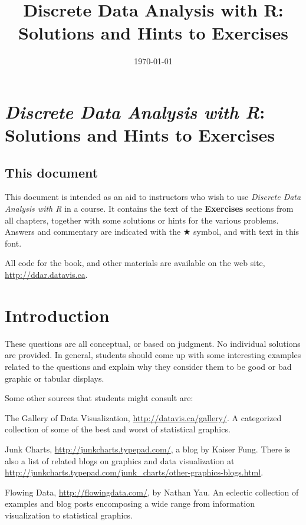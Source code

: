 \documentclass[10pt]{report}\usepackage[]{graphicx}\usepackage[]{color}
\title{\sffamily Discrete Data Analysis with R: \\ Solutions and Hints to Exercises}
\date{\today}
\begin{document}
\maketitle



\chapter*{\emph{Discrete Data Analysis with R}: \\ Solutions and Hints to Exercises}

{
\renewcommand{\baselinestretch}{.5}\normalsize
\sffamily\small
\tableofcontents
}

\vspace{3em}

\section*{This document}
This document is intended as an aid to instructors who wish to use
\emph{Discrete Data Analysis with R} in a course.  It contains the text
of the \textbf{Exercises} sections from all chapters, together with 
some solutions or hints for the various problems.  Answers and commentary are indicated
with the $\bigstar$ symbol, and \textsf{with text in this font}.

All \R code for the book, and other materials are available on the web site,
\url{http://ddar.datavis.ca}.

\clearpage
\chapter{Introduction}\label{ch:intro}
\begin{ans}
These questions are all conceptual, or based on judgment.  No individual solutions are provided.
In general, students should come up with some interesting examples related to the questions
and explain why they consider them to be good or bad graphic or tabular displays.

Some other sources that students might consult are:
\begin{itemize*}
  \item The Gallery of Data Visualization, \url{http://datavis.ca/gallery/}. A categorized
  collection of some of the best and worst of statistical graphics.
  \item Junk Charts, \url{http://junkcharts.typepad.com/}, a blog by Kaiser Fung.  There
  is also a list of related blogs on graphics and data visualization at
  \url{http://junkcharts.typepad.com/junk_charts/other-graphics-blogs.html}.
  \item Flowing Data, \url{http://flowingdata.com/}, by Nathan Yau. An eclectic
  collection of examples and blog posts encomposing a wide range from information visualization
  to statistical graphics.
\end{itemize*}
\end{ans}
\end{document}
